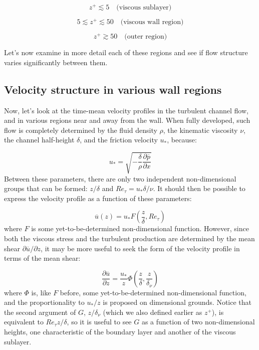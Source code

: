 \documentclass[12pt]{article}
\numberwithin{equation}{section}
\numberwithin{figure}{section}
\numberwithin{table}{section}
\begin{document}
\begin{equation}
  z^+ \lesssim 5 \quad \text{(viscous sublayer)}
\end{equation}

\begin{equation}
  5 \lesssim z^+ \lesssim 50 \quad \text{(viscous wall region)}
\end{equation}

\begin{equation}
  z^+ \gtrsim 50 \quad \text{(outer region)}
\end{equation}

Let's now examine in more detail each of these regions and see if flow structure
varies significantly between them.

\subsection{Velocity structure in various wall regions}

Now, let's look at the time-mean velocity profiles in the turbulent channel flow,
and in various regions near and away from the wall.
When fully developed, such flow is completely determined by the fluid density
$\rho$, the kinematic viscosity $\nu$, the channel half-height $\delta$, and
the friction velocity $u_*$, because:

\begin{equation}
  u_* = \sqrt{- \frac{\delta}{\rho} \frac{\partial \overline{p}}{\partial x}}
\end{equation}
Between these parameters, there are only two independent non-dimensional groups
that can be formed: $z/\delta$ and $Re_\tau = u_* \delta / \nu$.
It should then be possible to express the velocity profile as a function of
these parameters:

\begin{equation}
  \overline{u}(z) = u_* F\left(\frac{z}{\delta}, Re_\tau\right)
\end{equation}
where $F$ is some yet-to-be-determined non-dimensional function.
However, since both the viscous stress and the turbulent production are determined
by the mean shear $\partial \overline{u}/\partial z$, it may be more useful to
seek the form of the velocity profile in terms of the mean shear:

\begin{equation}
  \frac{\partial \overline{u}}{\partial z} = \frac{u_*}{z} \Phi\left(\frac{z}{\delta}, \frac{z}{\delta_\nu}\right)
  \label{eq:law_of_wall1}
\end{equation}
where $\Phi$ is, like $F$ before, some yet-to-be-determined non-dimensional
function, and the proportionality to $u_*/z$ is proposed on dimensional grounds.
Notice that the second argument of $G$, $z/\delta_\nu$ (which we also defined
earlier as $z^+$), is equivalent to $Re_\tau z/\delta$, so it is useful to see
$G$ as a function of two non-dimensional heights, one characteristic of the
boundary layer and another of the viscous sublayer.
\end{document}
